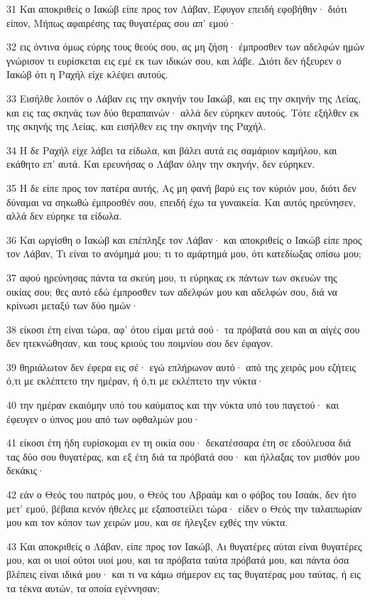 \par 31 Και αποκριθείς ο Ιακώβ είπε προς τον Λάβαν, Έφυγον επειδή εφοβήθην· διότι είπον, Μήπως αφαιρέσης τας θυγατέρας σου απ' εμού·
\par 32 εις όντινα όμως εύρης τους θεούς σου, ας μη ζήση· έμπροσθεν των αδελφών ημών γνώρισον τι ευρίσκεται εις εμέ εκ των ιδικών σου, και λάβε. Διότι δεν ήξευρεν ο Ιακώβ ότι η Ραχήλ είχε κλέψει αυτούς.
\par 33 Εισήλθε λοιπόν ο Λάβαν εις την σκηνήν του Ιακώβ, και εις την σκηνήν της Λείας, και εις τας σκηνάς των δύο θεραπαινών· αλλά δεν εύρηκεν αυτούς. Τότε εξήλθεν εκ της σκηνής της Λείας, και εισήλθεν εις την σκηνήν της Ραχήλ.
\par 34 Η δε Ραχήλ είχε λάβει τα είδωλα, και βάλει αυτά εις σαμάριον καμήλου, και εκάθητο επ' αυτά. Και ερευνήσας ο Λάβαν όλην την σκηνήν, δεν εύρηκεν.
\par 35 Η δε είπε προς τον πατέρα αυτής, Ας μη φανή βαρύ εις τον κύριόν μου, διότι δεν δύναμαι να σηκωθώ έμπροσθέν σου, επειδή έχω τα γυναικεία. Και αυτός ηρεύνησεν, αλλά δεν εύρηκε τα είδωλα.
\par 36 Και ωργίσθη ο Ιακώβ και επέπληξε τον Λάβαν· και αποκριθείς ο Ιακώβ είπε προς τον Λάβαν, Τι είναι το ανόμημά μου; τι το αμάρτημά μου, ότι κατεδίωξας οπίσω μου;
\par 37 αφού ηρεύνησας πάντα τα σκεύη μου, τι εύρηκας εκ πάντων των σκευών της οικίας σου; θες αυτό εδώ έμπροσθεν των αδελφών μου και αδελφών σου, διά να κρίνωσι μεταξύ των δύο ημών·
\par 38 είκοσι έτη είναι τώρα, αφ' ότου είμαι μετά σού· τα πρόβατά σου και αι αίγές σου δεν ητεκνώθησαν, και τους κριούς του ποιμνίου σου δεν έφαγον.
\par 39 θηριάλωτον δεν έφερα εις σέ· εγώ επλήρωνον αυτό· από της χειρός μου εζήτεις ό,τι με εκλέπτετο την ημέραν, ή ό,τι με εκλέπτετο την νύκτα·
\par 40 την ημέραν εκαιόμην υπό του καύματος και την νύκτα υπό του παγετού· και έφευγεν ο ύπνος μου από των οφθαλμών μου·
\par 41 είκοσι έτη ήδη ευρίσκομαι εν τη οικία σου· δεκατέσσαρα έτη σε εδούλευσα διά τας δύο σου θυγατέρας, και εξ έτη διά τα πρόβατά σου· και ήλλαξας τον μισθόν μου δεκάκις·
\par 42 εάν ο Θεός του πατρός μου, ο Θεός του Αβραάμ και ο φόβος του Ισαάκ, δεν ήτο μετ' εμού, βέβαια κενόν ήθελες με εξαποστείλει τώρα· είδεν ο Θεός την ταλαιπωρίαν μου και τον κόπον των χειρών μου, και σε ήλεγξεν εχθές την νύκτα.
\par 43 Και αποκριθείς ο Λάβαν, είπε προς τον Ιακώβ, Αι θυγατέρες αύται είναι θυγατέρες μου, και οι υιοί ούτοι υιοί μου, και τα πρόβατα ταύτα πρόβατά μου, και πάντα όσα βλέπεις είναι ιδικά μου· και τι να κάμω σήμερον εις τας θυγατέρας μου ταύτας, ή εις τα τέκνα αυτών, τα οποία εγέννησαν;
